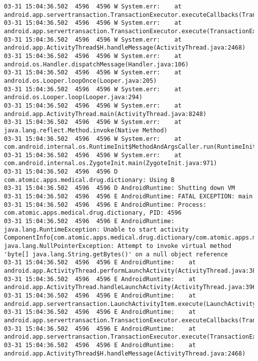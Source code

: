\begin{lstlisting}
03-31 15:04:36.502  4596  4596 W System.err: 	at android.app.servertransaction.TransactionExecutor.executeCallbacks(TransactionExecutor.java:139)
03-31 15:04:36.502  4596  4596 W System.err: 	at android.app.servertransaction.TransactionExecutor.execute(TransactionExecutor.java:96)
03-31 15:04:36.502  4596  4596 W System.err: 	at android.app.ActivityThread$H.handleMessage(ActivityThread.java:2468)
03-31 15:04:36.502  4596  4596 W System.err: 	at android.os.Handler.dispatchMessage(Handler.java:106)
03-31 15:04:36.502  4596  4596 W System.err: 	at android.os.Looper.loopOnce(Looper.java:205)
03-31 15:04:36.502  4596  4596 W System.err: 	at android.os.Looper.loop(Looper.java:294)
03-31 15:04:36.502  4596  4596 W System.err: 	at android.app.ActivityThread.main(ActivityThread.java:8248)
03-31 15:04:36.502  4596  4596 W System.err: 	at java.lang.reflect.Method.invoke(Native Method)
03-31 15:04:36.502  4596  4596 W System.err: 	at com.android.internal.os.RuntimeInit$MethodAndArgsCaller.run(RuntimeInit.java:552)
03-31 15:04:36.502  4596  4596 W System.err: 	at com.android.internal.os.ZygoteInit.main(ZygoteInit.java:971)
03-31 15:04:36.502  4596  4596 D com.atomic.apps.medical.drug.dictionary: Using B
03-31 15:04:36.502  4596  4596 D AndroidRuntime: Shutting down VM
03-31 15:04:36.502  4596  4596 E AndroidRuntime: FATAL EXCEPTION: main
03-31 15:04:36.502  4596  4596 E AndroidRuntime: Process: com.atomic.apps.medical.drug.dictionary, PID: 4596
03-31 15:04:36.502  4596  4596 E AndroidRuntime: java.lang.RuntimeException: Unable to start activity ComponentInfo{com.atomic.apps.medical.drug.dictionary/com.atomic.apps.medical.drug.dictionary.DrugsListActivity}: java.lang.NullPointerException: Attempt to invoke virtual method 'byte[] java.lang.String.getBytes()' on a null object reference
03-31 15:04:36.502  4596  4596 E AndroidRuntime: 	at android.app.ActivityThread.performLaunchActivity(ActivityThread.java:3822)
03-31 15:04:36.502  4596  4596 E AndroidRuntime: 	at android.app.ActivityThread.handleLaunchActivity(ActivityThread.java:3963)
03-31 15:04:36.502  4596  4596 E AndroidRuntime: 	at android.app.servertransaction.LaunchActivityItem.execute(LaunchActivityItem.java:103)
03-31 15:04:36.502  4596  4596 E AndroidRuntime: 	at android.app.servertransaction.TransactionExecutor.executeCallbacks(TransactionExecutor.java:139)
03-31 15:04:36.502  4596  4596 E AndroidRuntime: 	at android.app.servertransaction.TransactionExecutor.execute(TransactionExecutor.java:96)
03-31 15:04:36.502  4596  4596 E AndroidRuntime: 	at android.app.ActivityThread$H.handleMessage(ActivityThread.java:2468)

\end{lstlisting}
